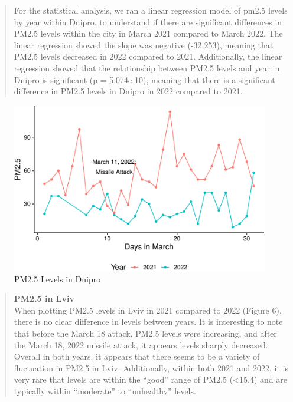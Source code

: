 \documentclass[
  12pt,
]{article}
\begin{document}
\begin{quote}
For the statistical analysis, we ran a linear regression model of pm2.5
levels by year within Dnipro, to understand if there are significant
differences in PM2.5 levels within the city in March 2021 compared to
March 2022. The linear regression showed the slope was negative
(-32.253), meaning that PM2.5 levels decreased in 2022 compared to 2021.
Additionally, the linear regression showed that the relationship between
PM2.5 levels and year in Dnipro is significant (p = 5.074e-10), meaning
that there is a significant difference in PM2.5 levels in Dnipro in 2022
compared to 2021.
\end{quote}

\begin{figure}
\centering
\includegraphics{Fontanie_Gordon_Weinberg_Project_files/figure-latex/Visualizing PM25 in Dnipro-1.pdf}
\caption{PM2.5 Levels in Dnipro}
\end{figure}

\newpage

\begin{quote}
\textbf{PM2.5 in Lviv}\\
When plotting PM2.5 levels in Lviv in 2021 compared to 2022 (Figure 6),
there is no clear difference in levels between years. It is interesting
to note that before the March 18 attack, PM2.5 levels were increasing,
and after the March 18, 2022 missile attack, it appears levels sharply
decreased. Overall in both years, it appears that there seems to be a
variety of fluctuation in PM2.5 in Lviv. Additionally, within both 2021
and 2022, it is very rare that levels are within the ``good'' range of
PM2.5 (\textless15.4) and are typically within ``moderate'' to
``unhealthy'' levels.
\end{quote}
\end{document}
